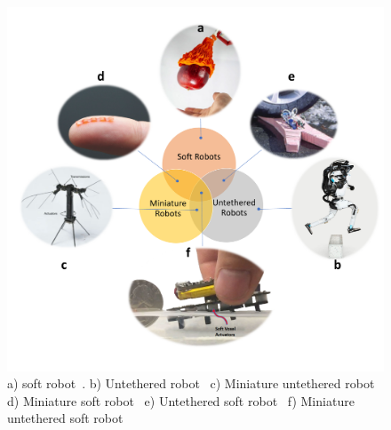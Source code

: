 \begin{figure}[!ht]
      \centering
      \includegraphics[width=\textwidth]{venn.pdf}
      \caption[Classification of robots.] {a) soft robot~\cite{Li2019}. b) Untethered robot~ c) Miniature untethered robot~\cite{Jafferis2019} d) Miniature soft robot~\cite{Tingting2012} e) Untethered soft robot~\cite{Tolley2014d} f) Miniature untethered soft robot~\cite{Khodambashi2021untethered}}
      \label{fig:venn}
\end{figure}

